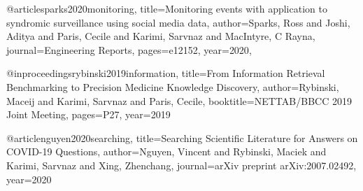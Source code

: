 @article{sparks2020monitoring,
  title={Monitoring events with application to syndromic surveillance using social media data},
  author={Sparks, Ross and Joshi, Aditya and Paris, Cecile and Karimi, Sarvnaz and MacIntyre, C Rayna},
  journal={Engineering Reports},
  pages={e12152},
  year={2020},
}

@inproceedings{rybinski2019information,
  title={From Information Retrieval Benchmarking to Precision Medicine Knowledge Discovery},
  author={Rybinski, Maceij and Karimi, Sarvnaz and Paris, Cecile},
  booktitle={NETTAB/BBCC 2019 Joint Meeting},
  pages={P27},
  year={2019}
}

@article{nguyen2020searching,
  title={Searching Scientific Literature for Answers on COVID-19 Questions},
  author={Nguyen, Vincent and Rybinski, Maciek and Karimi, Sarvnaz and Xing, Zhenchang},
  journal={arXiv preprint arXiv:2007.02492},
  year={2020}
}
